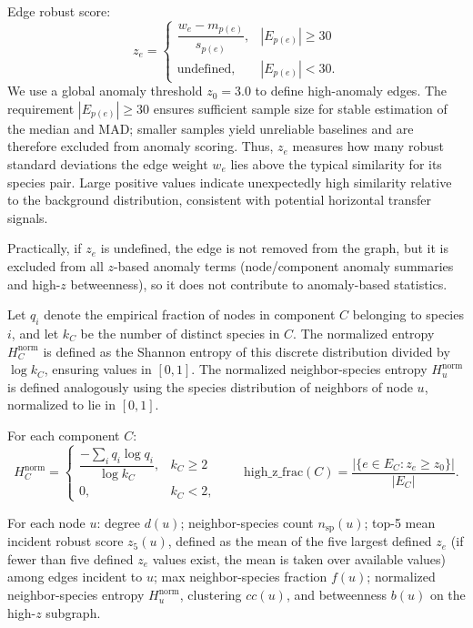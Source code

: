\documentclass{article}
\begin{document}
\vspace{0.5em}
Edge robust score:
\begin{equation}
z_e=
\begin{cases}
\dfrac{w_e-m_{p(e)}}{s_{p(e)}}, & |E_{p(e)}|\ge 30\\
\text{undefined}, & |E_{p(e)}|<30.
\end{cases}
\end{equation}
We use a global anomaly threshold $z_0=3.0$ to define high-anomaly edges. The requirement $|E_{p(e)}|\ge 30$ ensures sufficient sample size for stable estimation of the median and MAD; smaller samples yield unreliable baselines and are therefore excluded from anomaly scoring.
Thus, $z_e$ measures how many robust standard deviations the edge weight $w_e$ lies above the typical similarity for its species pair. 
Large positive values indicate unexpectedly high similarity relative to the background distribution, consistent with potential horizontal transfer signals.

Practically, if $z_e$ is undefined, the edge is not removed from the graph, but it is excluded from all $z$-based anomaly terms (node/component anomaly summaries and high-$z$ betweenness), so it does not contribute to anomaly-based statistics.
\vspace{0.5em}

Let $q_i$ denote the empirical fraction of nodes in component $C$ belonging to species $i$, and let $k_C$ be the number of distinct species in $C$. 
The normalized entropy $H_C^{\mathrm{norm}}$ is defined as the Shannon entropy of this discrete distribution divided by $\log k_C$, ensuring values in $[0,1]$.
The normalized neighbor-species entropy $H_u^{\mathrm{norm}}$ is defined analogously using the species distribution of neighbors of node $u$, normalized to lie in $[0,1]$.

For each component $C$:
\begin{equation}
H_C^{\mathrm{norm}}=
\begin{cases}
\dfrac{-\sum_i q_i\log q_i}{\log k_C}, & k_C\ge 2\\
0, & k_C<2,
\end{cases}
\qquad
\mathrm{high\_z\_frac}(C)=\frac{|\{e\in E_C:z_e\ge z_0\}|}{|E_C|}.
\end{equation}
\vspace{0.5em}

For each node $u$: degree $d(u)$; neighbor-species count $n_{\mathrm{sp}}(u)$; top-5 mean incident robust score $z_5(u)$, defined as the mean of the five largest defined $z_e$ (if fewer than five defined $z_e$ values exist, the mean is taken over available values) among edges incident to $u$; max neighbor-species fraction $f(u)$; normalized neighbor-species entropy $H_u^{\mathrm{norm}}$, clustering $cc(u)$, and betweenness $b(u)$ on the high-$z$ subgraph.
\end{document}

